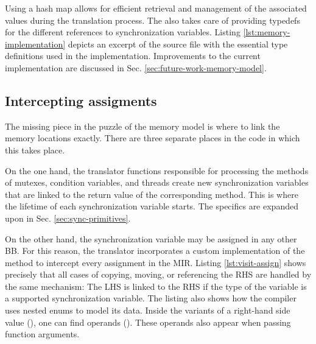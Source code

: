 Using a hash map allows for efficient retrieval
and management of the associated values during the translation process.
The  also takes care of providing typedefs for the different
references to synchronization variables.
Listing \ref{lst:memory-implementation} depicts an excerpt of the source file
with the essential type definitions used in the implementation.
Improvements to the current implementation are discussed in Sec. \ref{sec:future-work-memory-model}.

\subsection{Intercepting assigments}

The missing piece in the puzzle of the memory model is
where to link the memory locations exactly.
There are three separate places in the code in which this takes place.

On the one hand, the translator functions responsible for processing the methods
of mutexes, condition variables, and threads create new synchronization variables
that are linked to the return value of the corresponding method.
This is where the lifetime of each synchronization variable starts.
The specifics are expanded upon in Sec. \ref{sec:sync-primitives}.

On the other hand, the synchronization variable may be assigned in any other \acrshort{BB}.
For this reason, the translator incorporates a custom implementation of the method
 to intercept every assignment in the \acrshort{MIR}.
Listing \ref{lst:visit-assign} shows precisely
that all cases of copying, moving, or referencing the \acrfull{RHS}
are handled by the same mechanism:
The \acrfull{LHS} is linked to the \acrfull{RHS}
if the type of the variable is a supported synchronization variable.
The listing also shows how the compiler uses nested enums to model its data.
Inside the variants of a right-hand side value (),
one can find operands ().
These operands also appear when passing function arguments.

